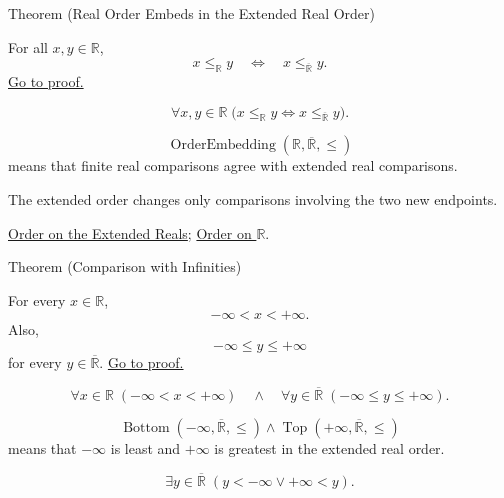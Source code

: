\begin{theorembox}{Theorem (Real Order Embeds in the Extended Real Order)}
\begin{theorem}
\label{thm:real-order-embeds-in-extended-real-order}
For all $x,y\in\mathbb{R}$,
\[
x\le_{\mathbb{R}}y
\quad\Longleftrightarrow\quad
x\le_{\overline{\mathbb{R}}}y.
\]
\hyperref[prf:real-order-embeds-in-extended-real-order]{Go to proof.}
\end{theorem}
\end{theorembox}
\begin{remark*}
\[
\forall x,y\in\mathbb{R}\;
\bigl(x\le_{\mathbb{R}}y\Longleftrightarrow
x\le_{\overline{\mathbb{R}}}y\bigr).
\]
\end{remark*}
\begin{remark*}
\[
\operatorname{OrderEmbedding}(\mathbb{R},\overline{\mathbb{R}},\le)
\]
means that finite real comparisons agree with extended real comparisons.
\end{remark*}
\begin{remark*}[Interpretation]
The extended order changes only comparisons involving the two new endpoints.
\end{remark*}
\begin{dependencies}
\hyperref[def:extended-real-order]{Order on the Extended Reals};
\hyperref[def:order-on-r]{Order on $\mathbb{R}$}.
\end{dependencies}

\begin{theorembox}{Theorem (Comparison with Infinities)}
\begin{theorem}
\label{thm:comparison-with-infinities}
For every $x\in\mathbb{R}$,
\[
-\infty<x<+\infty.
\]
Also,
\[
-\infty\le y\le+\infty
\]
for every $y\in\overline{\mathbb{R}}$.
\hyperref[prf:comparison-with-infinities]{Go to proof.}
\end{theorem}
\end{theorembox}
\begin{remark*}
\[
\forall x\in\mathbb{R}\;(-\infty<x<+\infty)
\quad\land\quad
\forall y\in\overline{\mathbb{R}}\;(-\infty\le y\le+\infty).
\]
\end{remark*}
\begin{remark*}
\[
\operatorname{Bottom}(-\infty,\overline{\mathbb{R}},\le)
\land
\operatorname{Top}(+\infty,\overline{\mathbb{R}},\le)
\]
means that $-\infty$ is least and $+\infty$ is greatest in the extended real order.
\end{remark*}
\begin{remark*}
\[
\exists y\in\overline{\mathbb{R}}\;(y<-\infty\lor +\infty<y).
\]
\end{remark*}

